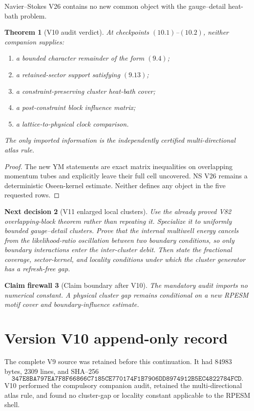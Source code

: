 \documentclass[11pt]{article}
\newtheorem{theorem}{Theorem}[section]
\newtheorem{firewall}[theorem]{Claim firewall}
\newtheorem{decision}[theorem]{Next decision}
\theoremstyle{remark}
\begin{document}
Navier--Stokes V26 contains no new common object with the
gauge--detail heat-bath problem.

\begin{theorem}[V10 audit verdict]
\label{thm:v15v10-verdict}
At checkpoints \((10.1)\)--\((10.2)\), neither companion supplies:
\begin{enumerate}
\item a bounded character remainder of the form \((9.4)\);
\item a retained-sector support satisfying \((9.13)\);
\item a constraint-preserving cluster heat-bath cover;
\item a post-constraint block influence matrix;
\item a lattice-to-physical clock comparison.
\end{enumerate}
The only imported information is the independently certified
multi-directional atlas rule.
\end{theorem}

\begin{proof}
The new YM statements are exact matrix inequalities on overlapping
momentum tubes and explicitly leave their full cell uncovered.
NS V26 remains a deterministic Oseen-kernel estimate.  Neither
defines any object in the five requested rows.
\end{proof}

\begin{decision}[V11 enlarged local clusters]
\label{dec:v15v10-next}
Use the already proved V82 overlapping-block theorem rather than
repeating it.  Specialize it to uniformly bounded gauge--detail
clusters.  Prove that the internal multiwell energy cancels from
the likelihood-ratio oscillation between two boundary conditions,
so only boundary interactions enter the inter-cluster debit.
Then state the fractional coverage, sector-kernel, and locality
conditions under which the cluster generator has a refresh-free
gap.
\end{decision}

\begin{firewall}[Claim boundary after V10]
\label{fire:v15v10}
The mandatory audit imports no numerical constant.  A physical
cluster gap remains conditional on a new RPESM motif cover and
boundary-influence estimate.
\end{firewall}

\section*{Version V10 append-only record}
The complete V9 source was retained before this continuation.  It
had \(84983\) bytes, \(2309\) lines, and SHA--256
\[
 \texttt{347E8BA797EA7F8F66866C7185CE770174F1B7906DD8974912B5EC4822784FCD}.
\]
V10 performed the compulsory companion audit, retained the
multi-directional atlas rule, and found no cluster-gap or locality
constant applicable to the RPESM shell.
\end{document}
